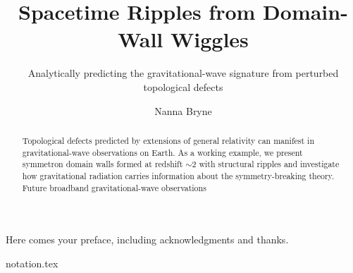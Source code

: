 \documentclass[UKenglish]{texmex/uiomasterthesis}
\title{Spacetime Ripples from Domain-Wall Wiggles}
\subtitle{Analytically predicting the gravitational-wave signature from perturbed topological defects}
\author{Nanna Bryne}
\begin{document}
% 



\uiomasterfp[
    dept={Institute of Theoretical Astrophysics\and Department of Physics},
    program={Computational Science:~Astrophysics}, 
    supervisor={David Fonseca Mota}, %
    color={blue},
    fgimage={starry-night.png},
    long] 





\frontmatter{}
\begin{abstract}
    Topological defects predicted by extensions of general relativity can manifest in gravitational-wave observations on Earth. As a working example, we present symmetron domain walls formed at redshift $\sim 2$ with structural ripples and investigate how gravitational radiation carries information about the symmetry-breaking theory. Future broadband gravitational-wave observations  
\end{abstract}


\tableofcontents{}
\listoffigures{}     
\listoftables{}       

\begin{preface}
    Here comes your preface, including acknowledgments and thanks.



\end{preface}

\begin{nomen}
    {notation.tex}
\end{nomen}





\mainmatter{}


\end{document}
